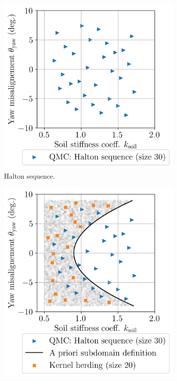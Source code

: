 \begin{figure}
    \centering
    \begin{subfigure}{0.48\linewidth}
        \vskip -30pt
        \includegraphics[width=\linewidth]{./part3/figures/OWT/initial_halton.png}
        \caption{Halton sequence.}
    \end{subfigure}
    \begin{subfigure}{0.48\linewidth}
        \includegraphics[width=\linewidth]{./part3/figures/OWT/initial_composite.png}

\end{subfigure}
\end{figure}
